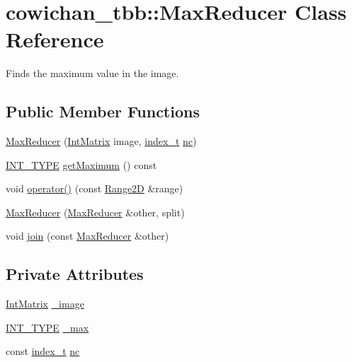 \hypertarget{classcowichan__tbb_1_1_max_reducer}{
\section{cowichan\_\-tbb::MaxReducer Class Reference}
\label{classcowichan__tbb_1_1_max_reducer}
}
Finds the maximum value in the image.  


\subsection*{Public Member Functions}
\begin{CompactItemize}
\item 
\hyperlink{classcowichan__tbb_1_1_max_reducer_040700219bf9b280323932d458116a53}{MaxReducer} (\hyperlink{cowichan_8hpp_82321152ddeeefe9c61350a42ed9e7af}{IntMatrix} image, \hyperlink{cowichan_8hpp_5b04577d5d21124855deaad298595371}{index\_\-t} \hyperlink{classcowichan__tbb_1_1_max_reducer_478817df677bfd5331c8a9a7f5e62de3}{nc})
\item 
\hyperlink{cowichan_8hpp_c96945095fd0ce7186a1d00a89f77d2c}{INT\_\-TYPE} \hyperlink{classcowichan__tbb_1_1_max_reducer_e4c54bf79d09499d4f91457a45a06a08}{getMaximum} () const 
\item 
void \hyperlink{classcowichan__tbb_1_1_max_reducer_a3ee1f93e3d1cf88da3669dfe73108f9}{operator()} (const \hyperlink{cowichan__tbb_8hpp_e591b8e6980ddc5982ee22655da2ab8e}{Range2D} \&range)
\item 
\hyperlink{classcowichan__tbb_1_1_max_reducer_df02ca92e3124c21671407a220a8081e}{MaxReducer} (\hyperlink{classcowichan__tbb_1_1_max_reducer}{MaxReducer} \&other, split)
\item 
void \hyperlink{classcowichan__tbb_1_1_max_reducer_ebeb8ee596f035a94d638b497135343b}{join} (const \hyperlink{classcowichan__tbb_1_1_max_reducer}{MaxReducer} \&other)
\end{CompactItemize}
\subsection*{Private Attributes}
\begin{CompactItemize}
\item 
\hyperlink{cowichan_8hpp_82321152ddeeefe9c61350a42ed9e7af}{IntMatrix} \hyperlink{classcowichan__tbb_1_1_max_reducer_f8ca766f2d3f828c10b03077e41f3a6b}{\_\-image}
\item 
\hyperlink{cowichan_8hpp_c96945095fd0ce7186a1d00a89f77d2c}{INT\_\-TYPE} \hyperlink{classcowichan__tbb_1_1_max_reducer_73c80dd6f6ded9d51b2c83e9a4a50501}{\_\-max}
\item 
const \hyperlink{cowichan_8hpp_5b04577d5d21124855deaad298595371}{index\_\-t} \hyperlink{classcowichan__tbb_1_1_max_reducer_478817df677bfd5331c8a9a7f5e62de3}{nc}
\end{CompactItemize}


